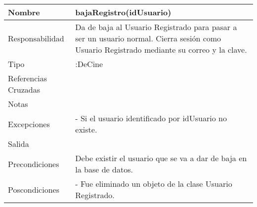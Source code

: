 \documentclass{article}
\begin{document}
\begin{table}[h]
\begin{tabular}{|l|l|l|l|l|l|}
\hline
\multicolumn{2}{|p{3cm}|}{Nombre} & \multicolumn{3}{p{8cm}|}{\textbf{bajaRegistro(idUsuario)}}\\
\hline
\multicolumn{2}{|p{3cm}|}{Responsabilidad} & \multicolumn{4}{p{8cm}|}{Da de baja al Usuario Registrado para pasar a ser un usuario normal. Cierra sesión como Usuario Registrado mediante su correo y la clave.} \\
\hline
\multicolumn{2}{|p{3cm}|}{Tipo} & \multicolumn{4}{p{8cm}|}{:DeCine} \\
\hline
\multicolumn{2}{|p{3cm}|}{Referencias Cruzadas} & \multicolumn{4}{p{8cm}|}{} \\
\hline
\multicolumn{2}{|p{3cm}|}{Notas} & \multicolumn{4}{p{8cm}|}{} \\
\hline
\multicolumn{2}{|p{3cm}|}{Excepciones} & \multicolumn{4}{p{8cm}|}{- Si el usuario identificado por idUsuario no existe.} \\
\hline
\multicolumn{2}{|p{3cm}|}{Salida} & \multicolumn{4}{p{8cm}|}{} \\
\hline
\multicolumn{2}{|p{3cm}|}{Precondiciones} & \multicolumn{4}{p{8cm}|}{Debe existir el usuario que se va a dar de baja en la base de datos.} \\
\hline
\multicolumn{2}{|p{3cm}|}{Poscondiciones} & \multicolumn{4}{p{8cm}|}{- Fue eliminado un objeto de la clase Usuario Registrado.} \\
\hline
\end{tabular}
\end{table}
\end{document}

